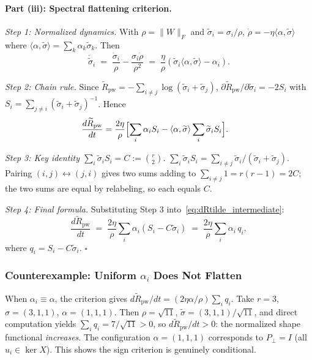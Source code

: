 \documentclass{article}
\begin{document}
\paragraph{Part (iii): Spectral flattening criterion.}

\emph{Step 1: Normalized dynamics.} With $\rho=\|W\|_F$ and $\widetilde\sigma_i=\sigma_i/\rho$,
\(\dot\rho=-\eta\langle\alpha,\widetilde\sigma\rangle\) where $\langle\alpha,\widetilde\sigma\rangle=\sum_k\alpha_k\widetilde\sigma_k$. Then
\[
  \dot{\widetilde\sigma}_i \;=\; \frac{\dot\sigma_i}{\rho} - \frac{\sigma_i\dot\rho}{\rho^2}
  \;=\; \frac{\eta}{\rho}(\widetilde\sigma_i\langle\alpha,\widetilde\sigma\rangle - \alpha_i).
\]

\emph{Step 2: Chain rule.} Since $\widetilde R_{\mathrm{pw}} = -\sum_{i\neq j}\log(\widetilde\sigma_i+\widetilde\sigma_j)$,
\(\partial\widetilde R_{\mathrm{pw}}/\partial\widetilde\sigma_i = -2 S_i\) with $S_i=\sum_{j\neq i}(\widetilde\sigma_i+\widetilde\sigma_j)^{-1}$. Hence
\begin{align}
  \frac{d\widetilde R_{\mathrm{pw}}}{dt}
  &= \frac{2\eta}{\rho}\Bigl[\sum_i\alpha_i S_i - \langle\alpha,\widetilde\sigma\rangle\sum_i\widetilde\sigma_i S_i\Bigr]. \label{eq:dRtilde_intermediate}
\end{align}

\emph{Step 3: Key identity $\sum_i\widetilde\sigma_i S_i = C := \binom{r}{2}$.}
$\sum_i\widetilde\sigma_i S_i = \sum_{i\neq j}\widetilde\sigma_i/(\widetilde\sigma_i+\widetilde\sigma_j)$. Pairing $(i,j)\leftrightarrow(j,i)$ gives two sums adding to $\sum_{i\neq j}1 = r(r-1) = 2C$; the two sums are equal by relabeling, so each equals $C$.

\emph{Step 4: Final formula.}
Substituting Step 3 into~\eqref{eq:dRtilde_intermediate}:
\[
  \frac{d\widetilde R_{\mathrm{pw}}}{dt}
  \;=\; \frac{2\eta}{\rho}\sum_i\alpha_i(S_i - C\widetilde\sigma_i)
  \;=\; \frac{2\eta}{\rho}\sum_i\alpha_i\,q_i,
\]
where $q_i = S_i - C\widetilde\sigma_i$. \hfill$\square$

\subsubsection{Counterexample: Uniform $\alpha_i$ Does Not Flatten}
\label{app:counterexample}

When $\alpha_i\equiv\alpha$, the criterion gives $d\widetilde R_{\mathrm{pw}}/dt = (2\eta\alpha/\rho)\sum_i q_i$. Take $r=3$, $\sigma=(3,1,1)$, $\alpha=(1,1,1)$. Then $\rho=\sqrt{11}$, $\widetilde\sigma=(3,1,1)/\sqrt{11}$, and direct computation yields $\sum_i q_i = 7/\sqrt{11} > 0$, so $d\widetilde R_{\mathrm{pw}}/dt > 0$: the normalized shape functional \emph{increases}. The configuration $\alpha=(1,1,1)$ corresponds to $P_\perp = I$ (all $u_i\in\ker X$). This shows the sign criterion is genuinely conditional.
\end{document}
